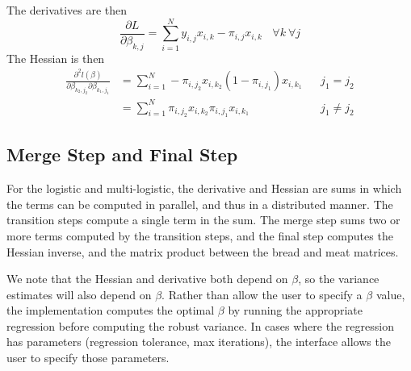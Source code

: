 \documentclass[12pt]{article}
\begin{document}
The derivatives are then
\begin{equation}\label{eq:first_derivative}
\frac{\partial L}{\partial \beta_{k,j}} = \sum_{i=1}^{N} y_{i,j}x_{i,k} - \pi_{i,j}x_{i,k} \ \ \ \ \forall k \  \forall j
\end{equation}
The Hessian is then 
\begin{align}\label{eq:second_derivative}
\frac{\partial^2 l({\beta})}{\partial \beta_{k_2,j_2} \partial \beta_{k_1,j_1}} 
&= \sum_{i=1}^{N} -\pi_{i,j_2}x_{i,k_2}(1-\pi_{i,j_1})x_{i,k_1} &&j_1 = j_2 \\
&= \sum_{i=1}^{N} \pi_{i,j_2}x_{i,k_2}\pi_{i,j_1}x_{i,k_1} &&j_1 \neq j_2 
\end{align}

\subsection{Merge Step and Final Step}

For the logistic and multi-logistic, the derivative and Hessian are sums in which the terms can be computed in parallel, and thus in a distributed manner.  The transition steps compute a single term in the sum.  The merge step sums two or more terms computed by the transition steps, and the final step computes the Hessian inverse, and the matrix product between the bread and meat matrices.  


We note that the Hessian and derivative both depend on $\beta$, so the variance estimates will also depend on $\beta$.  Rather than allow the user to specify a $\beta$ value, the implementation computes the optimal $\beta$ by running the appropriate regression  before computing the robust variance.  In cases where the regression has parameters (regression tolerance, max iterations), the interface allows the user to specify those parameters.

	
\end{document}
